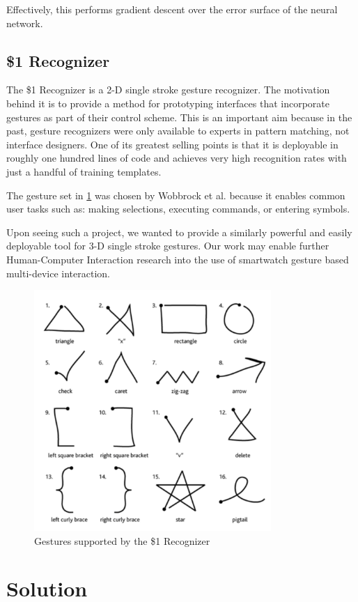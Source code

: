 \documentclass{report}
\begin{document}
Effectively, this performs gradient descent over the error surface of the neural network. \cite{Backprop}

\section{\$1 Recognizer}
The \$1 Recognizer is a 2-D single stroke gesture recognizer. The motivation behind it is to provide a method for prototyping interfaces that incorporate gestures as part of their control scheme. This is an important aim because in the past, gesture recognizers were only available to experts in pattern matching, not interface designers. One of its greatest selling points is that it is deployable in roughly one hundred lines of code and achieves very high recognition rates with just a handful of training templates.

The gesture set in \ref{gestures} was chosen by Wobbrock et al. because it enables common user tasks such as: making selections, executing commands, or entering symbols. \cite{Wobbrock}

Upon seeing such a project, we wanted to provide a similarly powerful and easily deployable tool for 3-D single stroke gestures. Our work may enable further Human-Computer Interaction research into the use of smartwatch gesture based multi-device interaction.

\begin{figure}[ht!]
  \label{gestures}
  \centering
  \includegraphics[width=90mm]{gestures}
  \caption{Gestures supported by the \$1 Recognizer}
\end{figure}

\chapter{Solution}
\end{document}
